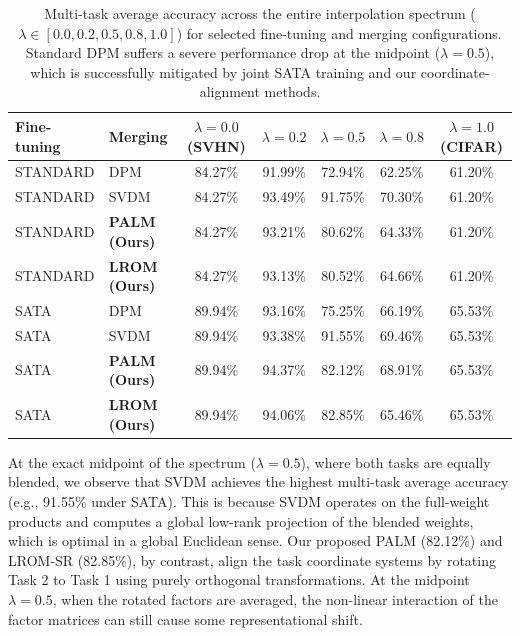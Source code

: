 \documentclass{article}
\theoremstyle{plain}
\theoremstyle{definition}
\theoremstyle{remark}
\begin{document}
\begin{table}[t]
\caption{Multi-task average accuracy across the entire interpolation spectrum ($\lambda \in [0.0, 0.2, 0.5, 0.8, 1.0]$) for selected fine-tuning and merging configurations. Standard DPM suffers a severe performance drop at the midpoint ($\lambda = 0.5$), which is successfully mitigated by joint SATA training and our coordinate-alignment methods.}
\label{tab:spectrum}
\begin{center}
\begin{small}
\begin{tabular}{llccccc}
\toprule
\textbf{Fine-tuning} & \textbf{Merging} & \textbf{$\lambda = 0.0$ (SVHN)} & \textbf{$\lambda = 0.2$} & \textbf{$\lambda = 0.5$} & \textbf{$\lambda = 0.8$} & \textbf{$\lambda = 1.0$ (CIFAR)} \\
\midrule
STANDARD & DPM & 84.27\% & 91.99\% & 72.94\% & 62.25\% & 61.20\% \\
STANDARD & SVDM & 84.27\% & 93.49\% & 91.75\% & 70.30\% & 61.20\% \\
STANDARD & \textbf{PALM (Ours)} & 84.27\% & 93.21\% & 80.62\% & 64.33\% & 61.20\% \\
STANDARD & \textbf{LROM (Ours)} & 84.27\% & 93.13\% & 80.52\% & 64.66\% & 61.20\% \\
\midrule
SATA & DPM & 89.94\% & 93.16\% & 75.25\% & 66.19\% & 65.53\% \\
SATA & SVDM & 89.94\% & 93.38\% & 91.55\% & 69.46\% & 65.53\% \\
SATA & \textbf{PALM (Ours)} & 89.94\% & 94.37\% & 82.12\% & 68.91\% & 65.53\% \\
SATA & \textbf{LROM (Ours)} & 89.94\% & 94.06\% & 82.85\% & 65.46\% & 65.53\% \\
\bottomrule
\end{tabular}
\end{small}
\end{center}
\end{table}

At the exact midpoint of the spectrum ($\lambda = 0.5$), where both tasks are equally blended, we observe that SVDM achieves the highest multi-task average accuracy (e.g., 91.55\% under SATA). This is because SVDM operates on the full-weight products and computes a global low-rank projection of the blended weights, which is optimal in a global Euclidean sense. Our proposed PALM (82.12\%) and LROM-SR (82.85\%), by contrast, align the task coordinate systems by rotating Task 2 to Task 1 using purely orthogonal transformations. At the midpoint $\lambda = 0.5$, when the rotated factors are averaged, the non-linear interaction of the factor matrices can still cause some representational shift.
\end{document}
